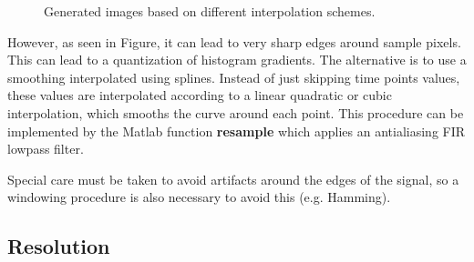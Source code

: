 \begin{figure}[htb]
\centering
{}
\caption[Signal Plotting: Interpolation]{Generated images based on different interpolation schemes.}
\label{fig:interpolation}
\end{figure}

However, as seen in Figure, it can lead to very sharp edges around sample pixels.  This can lead to a quantization of histogram gradients. The alternative is to use a smoothing interpolated using splines.  Instead of just skipping time points values, these values are interpolated according to a linear quadratic or cubic interpolation, which smooths the curve around each point.  This procedure can be implemented by the Matlab function \textbf{resample} which applies an antialiasing FIR lowpass filter.

Special care must be taken to avoid artifacts around the edges of the signal, so a windowing procedure is also necessary to avoid this (e.g. Hamming).

\subsection{Resolution}

